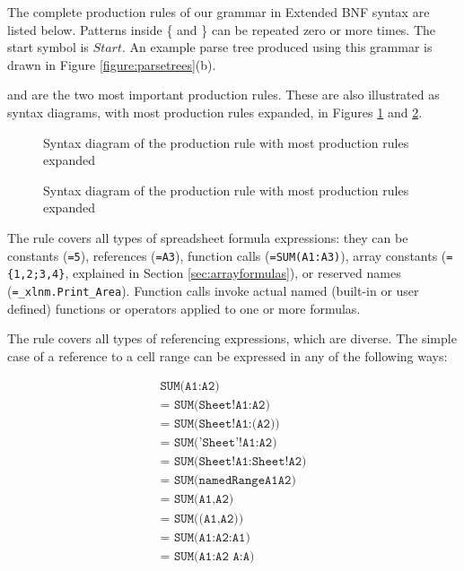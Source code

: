 \documentclass[times]{smrauth}
\begin{document}
The complete production rules of our grammar in Extended BNF syntax are listed below.
Patterns inside \{ and \} can be repeated zero or more times.
The start symbol is $Start$. An example parse tree produced using this grammar is drawn in Figure \ref{figure:parsetrees}(b).



 and  are the two most important production rules.
These are also illustrated as syntax diagrams, with most production rules expanded, in Figures \ref{figure:Formula} and \ref{figure:Reference}.

\begin{figure}[]
	
	\caption{Syntax diagram of the  production rule with most production rules expanded}
	\label{figure:Formula}
\end{figure}

\begin{figure}[]
	\centering
	
	\caption{Syntax diagram of the  production rule with most production rules expanded}
	\label{figure:Reference}
\end{figure}

The  rule covers all types of spreadsheet formula expressions: they can be constants (\texttt{=5}), references (\texttt{=A3}), function calls (\texttt{=SUM(A1:A3)}), array constants (\texttt{=\{1,2;3,4\}}, explained in Section \ref{sec:arrayformulas}), or reserved names (\texttt{=_xlnm.Print_Area}). Function calls invoke actual named (built-in or user defined) functions or operators applied to one or more formulas.

The  rule covers all types of referencing expressions, which are diverse. The simple case of a reference to a cell range can be expressed in any of the following ways:

\begin{align}
	\texttt{SUM(A1:A2)} \\ 
	\texttt{= SUM(Sheet!A1:A2)} \\
	\texttt{= SUM(Sheet!A1:(A2))} \\
	\texttt{= SUM('Sheet'!A1:A2)} \\
	\texttt{= SUM(Sheet!A1:Sheet!A2)} \\
	\texttt{= SUM(namedRangeA1A2)} \\ 
	\texttt{= SUM(A1,A2)} \\ 
	\texttt{= SUM((A1,A2))} \\ 
	\texttt{= SUM(A1:A2:A1)} \\
	\texttt{= SUM(A1:A2 A:A)} 
\end{align}
\end{document}
